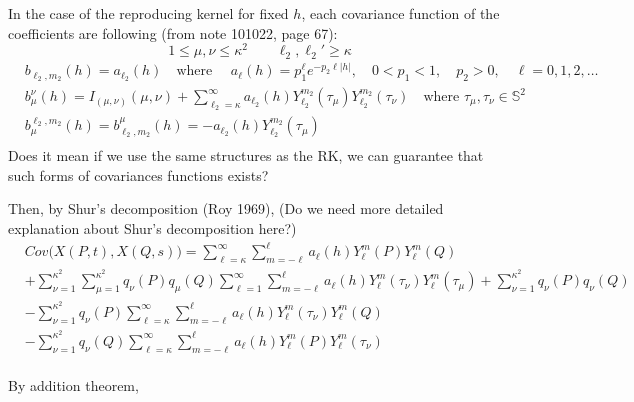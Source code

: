 \documentclass[11pt]{article}
\begin{document}
\begin{itemize}
{\color{red}
In the case of the reproducing kernel for fixed $h$, each covariance function of the coefficients are following (from note 101022, page 67): \\
$$1 \le \mu, \nu \le \kappa^2 \quad \quad \ell_2, {\ell_2}'  \ge \kappa$$ 
\begin{align*}
&b_{\ell_2,m_2}(h) = a_{\ell_2}(h) \quad \text{where } \quad a_\ell(h)=p_1^\ell e^{-p_2 \ell |h|}, \quad 0<p_1<1, \quad p_2>0, \quad \ell=0,1,2,\dots\\
&b_{\mu}^{\nu}(h) = I_{(\mu, \nu)}(\mu, \nu) + \sum_{\ell_2=\kappa}^{\infty} a_{\ell_2}(h) Y_{\ell_2}^{m_2}(\tau_\mu) Y_{\ell_2}^{m_2}(\tau_\nu)  \quad \text{where } \tau_\mu, \tau_\nu \in \mathbb{S}^2 \\
&b_{\mu}^{\ell_2,m_2}(h) = b_{\ell_2,m_2}^{\mu}(h) = -a_{\ell_2}(h) Y_{\ell_2}^{m_2}(\tau_\mu)\\
\end{align*}
Does it mean if we use the same structures as the RK, we can guarantee that such forms of covariances functions exists?\\
}

\pagebreak

Then, by Shur's decomposition (Roy 1969), {\color{red} (Do we need more detailed explanation about Shur's decomposition here?)}\\
\begin{align*}
&Cov\biggl(X(P,t), X(Q,s)\biggl) = \sum_{\ell=\kappa}^{\infty} \sum_{m=-\ell}^{\ell} a_{\ell}(h) Y_{\ell}^{m}(P) Y_{\ell}^{m}(Q)\\ 
&+ \sum_{\nu=1}^{\kappa^2} \sum_{\mu=1}^{\kappa^2} q_{\nu}(P) q_{\mu}(Q) \sum_{\ell=1}^{\infty} \sum_{m=-\ell}^{\ell}  a_{\ell}(h) Y_{\ell}^{m}(\tau_{\nu}) Y_{\ell}^{m}(\tau_{\mu}) + \sum_{\nu=1}^{\kappa^2}q_{\nu}(P) q_{\nu}(Q)\\
&- \sum_{\nu=1}^{\kappa^2} q_{\nu}(P) \sum_{\ell=\kappa}^{\infty} \sum_{m=-\ell}^{\ell}  a_{\ell}(h) Y_{\ell}^{m}(\tau_{\nu}) Y_{\ell}^{m}(Q)\\ 
&- \sum_{\nu=1}^{\kappa^2} q_{\nu}(Q) \sum_{\ell=\kappa}^{\infty} \sum_{m=-\ell}^{\ell}  a_{\ell}(h) Y_{\ell}^{m}(P) Y_{\ell}^{m}(\tau_{\nu})\\
\end{align*}

By addition theorem,\\


\end{itemize}
\end{document}
